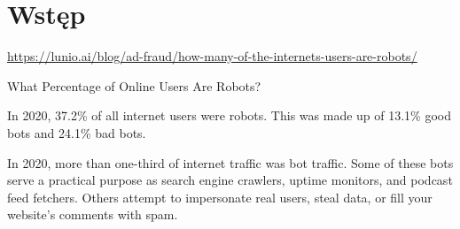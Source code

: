 \newpage


\section{Wstęp}

\noindent {}

\noindent \url{https://lunio.ai/blog/ad-fraud/how-many-of-the-internets-users-are-robots/}

\noindent What Percentage of Online Users Are Robots?

\noindent In 2020, 37.2\% of all internet users were robots.
This was made up of 13.1\% good bots and 24.1\% bad bots.

\noindent In 2020, more than one-third of internet traffic was bot traffic.
Some of these bots serve a practical purpose as search engine crawlers, uptime monitors, and podcast feed fetchers.
Others attempt to impersonate real users, steal data, or fill your website's comments with spam.

